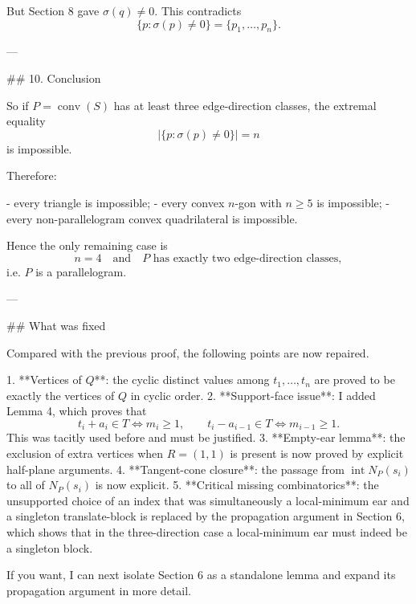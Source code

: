 But Section 8 gave \(\sigma(q)\neq0\). This contradicts
\[
\{p:\sigma(p)\neq0\}=\{p_1,\dots,p_n\}.
\]

---

## 10. Conclusion

So if \(P=\operatorname{conv}(S)\) has at least three edge-direction classes, the extremal equality
\[
\bigl|\{p:\sigma(p)\neq0\}\bigr|=n
\]
is impossible.

Therefore:

- every triangle is impossible;
- every convex \(n\)-gon with \(n\ge5\) is impossible;
- every non-parallelogram convex quadrilateral is impossible.

Hence the only remaining case is
\[
n=4
\quad\text{and}\quad
P\text{ has exactly two edge-direction classes},
\]
i.e. \(P\) is a parallelogram.

---

## What was fixed

Compared with the previous proof, the following points are now repaired.

1. **Vertices of \(Q\)**: the cyclic distinct values among \(t_1,\dots,t_n\) are proved to be exactly the vertices of \(Q\) in cyclic order.
2. **Support-face issue**: I added Lemma 4, which proves that
   \[
   t_i+a_i\in T \iff m_i\ge1,\qquad t_i-a_{i-1}\in T \iff m_{i-1}\ge1.
   \]
   This was tacitly used before and must be justified.
3. **Empty-ear lemma**: the exclusion of extra vertices when \(R=(1,1)\) is present is now proved by explicit half-plane arguments.
4. **Tangent-cone closure**: the passage from \(\operatorname{int}N_P(s_i)\) to all of \(N_P(s_i)\) is now explicit.
5. **Critical missing combinatorics**: the unsupported choice of an index that was simultaneously a local-minimum ear and a singleton translate-block is replaced by the propagation argument in Section 6, which shows that in the three-direction case a local-minimum ear must indeed be a singleton block.

If you want, I can next isolate Section 6 as a standalone lemma and expand its propagation argument in more detail.